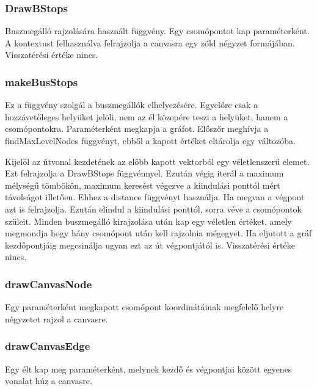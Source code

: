 \subsubsection{DrawBStops}
Buszmegálló rajzolására használt függvény. Egy csomópontot kap paraméterként. A kontextust felhasználva felrajzolja a canvasra egy zöld négyzet formájában. Visszatérési értéke nincs.
\subsubsection{makeBusStops}
Ez a függvény szolgál a buszmegállók elhelyezésére. Egyelőre csak a hozzávetőleges helyüket jelöli, nem az él közepére teszi a helyüket, hanem a csomópontokra. Paraméterként megkapja a gráfot. Előszőr meghívja a findMaxLevelNodes függvényt, ebből a kapott értéket eltárolja egy változóba. 

Kijelöl az útvonal kezdetének az előbb kapott vektorból egy véletlenszerű elemet. Ezt felrajzolja a DrawBStops függvénnyel. Ezután végig iterál a maximum mélységű tömbökön, maximum keresést végezve a kiindulási ponttól mért távolságot illetően. Ehhez a distance függvényt használja. Ha megvan a végpont azt is felrajzolja. 
Ezután elindul a kiindulási ponttól, sorra véve a csomópontok szüleit. Minden buszmegálló kirajzolása után kap egy véletlen értéket, amely megmondja hogy hány csomópont után kell rajzolnia mégegyet. Ha eljutott a gráf kezdőpontjáig megcsinálja ugyan ezt az út végpontjától is. Visszatérési értéke nincs.
\subsubsection{drawCanvasNode}
Egy paraméterként megkapott csomópont koordinátáinak megfelelő helyre négyzetet rajzol a canvasre.
\subsubsection{drawCanvasEdge}
Egy élt kap meg paraméterként, melynek kezdő és végpontjai között egyenes vonalat húz a canvasre.
